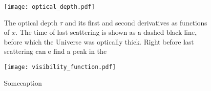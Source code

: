     \begin{figure}
        \texttt{[image: optical\_depth.pdf]}
        \caption{The optical depth $\tau$ and its first and second derivatives as functions of $x$. The time of last scattering is shown as a dashed black line, before which the Universe was optically thick. Right before last scattering can e find a peak in the }
        \label{fig:m2:optical_depth}
    \end{figure}

    \begin{figure}
        \texttt{[image: visibility\_function.pdf]}
        \caption{Somecaption}
        \label{fig:m2:visibility_function}
    \end{figure}



